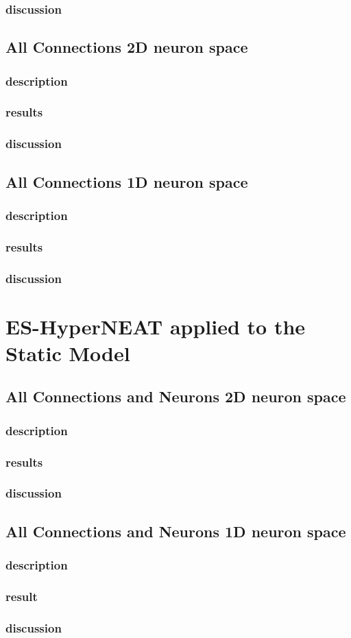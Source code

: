 \subsubsection{discussion}
\subsection{All Connections 2D neuron space}
\subsubsection{description}
\subsubsection{results}
\subsubsection{discussion}
\subsection{All Connections 1D neuron space}
\subsubsection{description}
\subsubsection{results}
\subsubsection{discussion}

\section{ES-HyperNEAT applied to the Static Model}
\subsection{All Connections and Neurons 2D neuron space}

\subsubsection{description}
\subsubsection{results}
\subsubsection{discussion}

\subsection{All Connections and Neurons 1D neuron space}

\subsubsection{description}
\subsubsection{result}
\subsubsection{discussion}